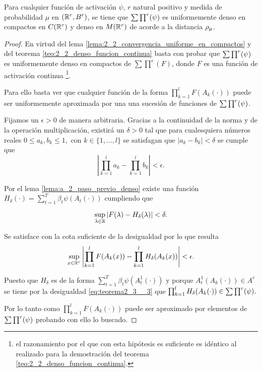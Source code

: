 \begin{teorema}
    Para cualquier función de activación $\psi$, $r$ natural positivo y
    medida de probabilidad $\mu$ en $(\mathbb{R}^r, B^r)$, 
    se tiene que $\sum \prod^r (\psi)$ es uniformemente denso en compactos
    en $C(\mathbb{R}^r)$ y denso en $M(\mathbb{R}^r)$ de acorde a la distancia $\rho_{\mu}$. 
\end{teorema}
\begin{proof}
    En virtud del lema \ref{lema:2_2_convergencia_uniforme_en_compactos} y del 
    teorema \ref{teo:2_2_denso_funcion_continua} basta con probar que 
    $\sum \prod^r (\psi)$ es uniformemente denso en compactos de $\sum \prod^r(F)$, 
    donde $F$ es una función de activación continua 
    \footnote{el razonamiento 
    por el que con esta hipótesis es suficiente es idéntico al realizado para la 
    demostración del teorema \ref{teo:2_2_denso_funcion_continua}.}.

    Para ello basta ver que cualquier función de la forma $\prod_{k=1}^l F(A_k(\cdot))$
    puede ser uniformemente aproximada por una una sucesión de funciones de $\sum \prod^r (\psi)$.

    Fijamos un $\epsilon > 0$  de manera arbitraria. 
    Gracias a la continuidad de la norma y de la operación multiplicación, existirá un $\delta >0$
    tal que para cualesquiera números reales $0 \leq a_k, b_k \leq 1,$ con $k \in \{1,...,l\}$ 
    se satisfagan que $|a_k -b_k| < \delta$ se cumple que 
    \begin{equation} \label{eq:teorema_2_3__1}
        \left| 
            \prod^l_{k=1} a_k - \prod^l_{k=1} b_k 
        \right| 
        < 
        \epsilon.
    \end{equation}

    Por el lema \ref{lema:a_2_paso_previo_denso} existe una función 
    $H_{\delta}(\cdot) = \sum_{t=1}^T \beta_t \psi(A_t(\cdot))$
    cumpliendo que 

    \begin{equation}
        \sup_{\lambda \in \mathbb{R}} |F(\lambda) - H_{\delta}(\lambda) | < \delta.
    \end{equation}

    Se satisface con la cota suficiente de la desigualdad  por lo que 
    resulta 
    \begin{equation}\label{eq:teorema2_3__3}
        \sup_{x \in \mathbb{R}^r} 
        \left| 
            \prod ^l_{k=1} F(A_k(x))
            -
            \prod ^l_{k=1} H_\delta(A_k(x))
        \right| 
        < 
        \epsilon.
    \end{equation} 
    
    Puesto que $H_\delta$ es de la forma  $\sum_{t=1}^T \beta_t \psi(A^1_t(\cdot))$ 
    y porque $A^1_t(A_k(\cdot)) \in A^r$ se tiene por la desigualdad \ref{eq:teorema2_3__3} que 
    $\prod ^l_{k=1} H_\delta(A_k(\cdot)) \in \sum \prod^r (\psi).$

    Por lo tanto como  $\prod ^l_{k=1} F(A_k(\cdot))$ puede ser 
    aproximado por elementos de $\sum \prod^r (\psi)$ probando con ello lo buscado. 
\end{proof} 

